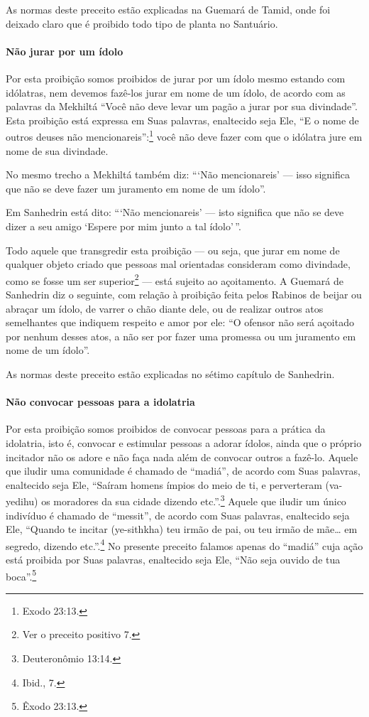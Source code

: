 As normas deste preceito estão explicadas na Guemará de Tamid, onde foi
deixado claro que é proibido todo tipo de planta no Santuário.

\paragraph{Não jurar por um ídolo}

Por esta proibição somos proibidos de jurar por um ídolo mesmo estando
com idólatras, nem devemos fazê-los jurar em nome de um ídolo, de acordo
com as palavras da Mekhiltá ``Você não deve levar um pagão a jurar por
sua divindade''. Esta proibição está expressa em Suas palavras,
enaltecido seja Ele, ``E o nome de outros deuses não mencionareis'':\footnote{Exodo 23:13.} você não deve fazer com que o idólatra jure em nome de
sua divindade.

No mesmo trecho a Mekhiltá também diz: ```Não mencionareis' --- isso
significa que não se deve fazer um juramento em nome de um ídolo''.

Em Sanhedrin está dito: ```Não mencionareis' --- isto significa que não
se deve dizer a seu amigo `Espere por mim junto a tal ídolo'\,''.

Todo aquele que transgredir esta proibição --- ou seja, que jurar em
nome de qualquer objeto criado que pessoas mal orientadas consideram
como divindade, como se fosse um ser superior\footnote{Ver o preceito positivo 7.} ---
está sujeito ao açoitamento. A Guemará de Sanhedrin diz o seguinte, com
relação à proibição feita pelos Rabinos de beijar ou abraçar um ídolo,
de varrer o chão diante dele, ou de realizar outros atos semelhantes que
indiquem respeito e amor por ele: ``O ofensor não será açoitado por
nenhum desses atos, a não ser por fazer uma promessa ou um juramento em
nome de um ídolo''.

As normas deste preceito estão explicadas no sétimo capítulo de Sanhedrin.

\paragraph{Não convocar pessoas para a idolatria}

Por esta proibição somos proibidos de convocar pessoas para a prática
da idolatria, isto é, convocar e estimular pessoas a adorar ídolos,
ainda que o próprio incitador não os adore e não faça nada além de
convocar outros a fazê-lo. Aquele que iludir uma comunidade é chamado de
``madiá'', de acordo com Suas palavras, enaltecido seja Ele, ``Saíram
homens ímpios do meio de ti, e perverteram (va-yedihu) os moradores da
sua cidade dizendo etc.''.\footnote{Deuteronômio 13:14.} Aquele que iludir um
único indivíduo é chamado de ``messit'', de acordo com Suas palavras,
enaltecido seja Ele, ``Quando te incitar (ye-sithkha) teu irmão de pai,
ou teu irmão de mãe\ldots{} em segredo, dizendo etc.''.\footnote{Ibid., 7.} No
presente preceito falamos apenas do ``madiá'' cuja ação está proibida
por Suas palavras, enaltecido seja Ele, ``Não seja ouvido de tua boca''.\footnote{Êxodo 23:13.}

